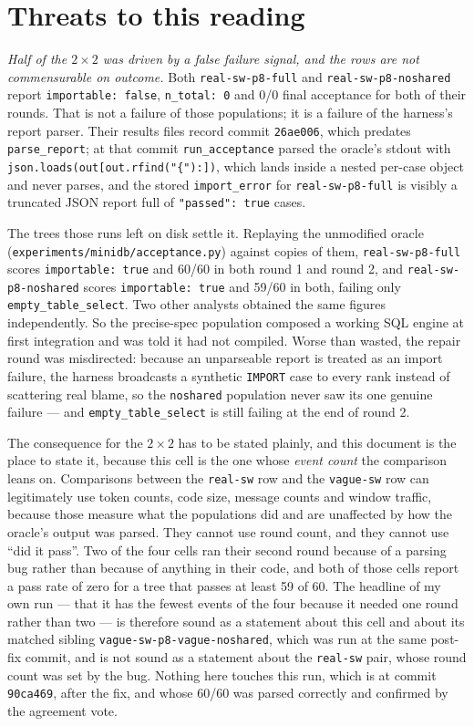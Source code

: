 \documentclass[11pt]{article}
\begin{document}
\section{Threats to this reading}

\emph{Half of the $2\times2$ was driven by a false failure signal, and the rows are not
commensurable on outcome.} Both \texttt{real-sw-p8-full} and \texttt{real-sw-p8-noshared} report
\texttt{importable: false}, \texttt{n\_total: 0} and 0/0 final acceptance for both of their
rounds. That is not a failure of those populations; it is a failure of the harness's report
parser. Their results files record commit \texttt{26ae006}, which predates
\texttt{parse\_report}; at that commit \texttt{run\_acceptance} parsed the oracle's stdout with
\texttt{json.loads(out[out.rfind("\{"):])}, which lands inside a nested per-case object and never
parses, and the stored \texttt{import\_error} for \texttt{real-sw-p8-full} is visibly a truncated
JSON report full of \texttt{"passed": true} cases.

The trees those runs left on disk settle it. Replaying the unmodified oracle
(\texttt{experiments/minidb/acceptance.py}) against copies of them, \texttt{real-sw-p8-full}
scores \texttt{importable: true} and 60/60 in both round 1 and round 2, and
\texttt{real-sw-p8-noshared} scores \texttt{importable: true} and 59/60 in both, failing only
\texttt{empty\_table\_select}. Two other analysts obtained the same figures independently. So the
precise-spec population composed a working SQL engine at first integration and was told it had
not compiled. Worse than wasted, the repair round was misdirected: because an unparseable report
is treated as an import failure, the harness broadcasts a synthetic \texttt{IMPORT} case to every
rank instead of scattering real blame, so the \texttt{noshared} population never saw its one
genuine failure --- and \texttt{empty\_table\_select} is still failing at the end of round 2.

The consequence for the $2\times2$ has to be stated plainly, and this document is the place to
state it, because this cell is the one whose \emph{event count} the comparison leans on.
Comparisons between the \texttt{real-sw} row and the \texttt{vague-sw} row can legitimately use
token counts, code size, message counts and window traffic, because those measure what the
populations did and are unaffected by how the oracle's output was parsed. They cannot use round
count, and they cannot use ``did it pass''. Two of the four cells ran their second round because
of a parsing bug rather than because of anything in their code, and both of those cells report a
pass rate of zero for a tree that passes at least 59 of 60. The headline of my own run --- that it
has the fewest events of the four because it needed one round rather than two --- is therefore
sound as a statement about this cell and about its matched sibling
\texttt{vague-sw-p8-vague-noshared}, which was run at the same post-fix commit, and is not sound
as a statement about the \texttt{real-sw} pair, whose round count was set by the bug. Nothing here
touches this run, which is at commit \texttt{90ca469}, after the fix, and whose 60/60 was parsed
correctly and confirmed by the agreement vote.
\end{document}
